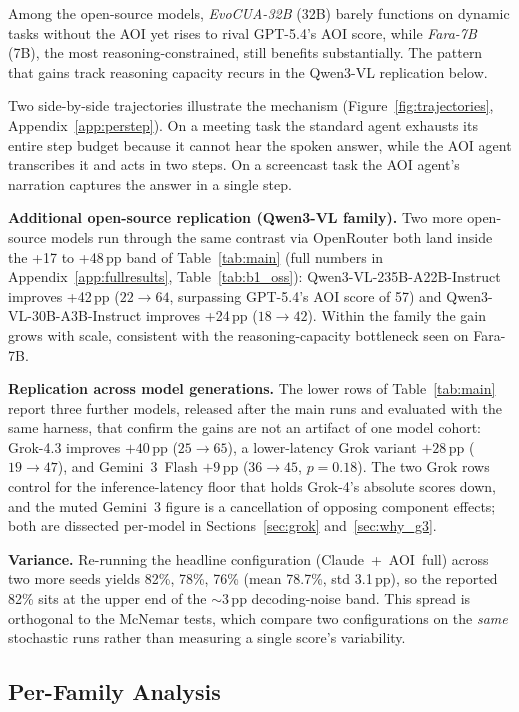 \documentclass[11pt]{article}
\begin{document}
Among the open-source models, \emph{EvoCUA-32B} (32B) barely functions on dynamic tasks without the AOI yet rises to rival GPT-5.4's AOI score, while \emph{Fara-7B} (7B), the most reasoning-constrained, still benefits substantially. The pattern that gains track reasoning capacity recurs in the Qwen3-VL replication below.

Two side-by-side trajectories illustrate the mechanism (Figure~\ref{fig:trajectories}, Appendix~\ref{app:perstep}). On a meeting task the standard agent exhausts its entire step budget because it cannot hear the spoken answer, while the AOI agent transcribes it and acts in two steps. On a screencast task the AOI agent's narration captures the answer in a single step.

\textbf{Additional open-source replication (Qwen3-VL family).}
Two more open-source models run through the same contrast via OpenRouter both land inside
the +17 to +48\,pp band of Table~\ref{tab:main} (full numbers in Appendix~\ref{app:fullresults},
Table~\ref{tab:b1_oss}): Qwen3-VL-235B-A22B-Instruct~\citep{qwen3vl} improves +42\,pp
($22 \to 64$, surpassing GPT-5.4's AOI score of 57) and Qwen3-VL-30B-A3B-Instruct improves
+24\,pp ($18 \to 42$). Within the family the gain grows with scale, consistent with the
reasoning-capacity bottleneck seen on Fara-7B.

\textbf{Replication across model generations.}
The lower rows of Table~\ref{tab:main} report three further models, released after the main
runs and evaluated with the same harness, that confirm the gains are not an artifact of one
model cohort: Grok-4.3 improves $+40$\,pp ($25 \to 65$), a lower-latency Grok variant $+28$\,pp
($19 \to 47$), and Gemini~3~Flash $+9$\,pp ($36 \to 45$, $p=0.18$). The two Grok rows control
for the inference-latency floor that holds Grok-4's absolute scores down, and the muted Gemini~3
figure is a cancellation of opposing component effects; both are dissected per-model in
Sections~\ref{sec:grok} and~\ref{sec:why_g3}.

\textbf{Variance.}
Re-running the headline configuration (Claude~+~AOI~full) across two more seeds yields
82\%, 78\%, 76\% (mean 78.7\%, std 3.1\,pp), so the reported 82\% sits at the upper end
of the $\sim$3\,pp decoding-noise band. This spread is orthogonal to the McNemar tests,
which compare two configurations on the \emph{same} stochastic runs rather than measuring
a single score's variability.

\subsection{Per-Family Analysis}
\end{document}
